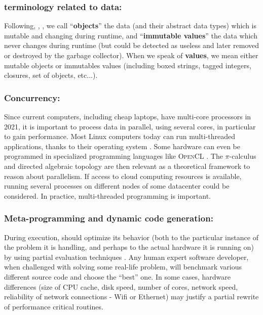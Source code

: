 \documentclass{svproc}
\begin{document}
\subsubsection{terminology related to data:} Following\cite{abadi:2012:theory-objects},
\cite{hindley:2008:lambda}, \cite{queinnec:2003:lisp}, we call
``\textbf{objects}'' the data (and their abstract data types) which is
mutable and changing during runtime, and ``\textbf{immutable values}''
the data which never changes during runtime (but could be detected as
useless and later removed or destroyed by the garbage collector). When
we speak of \textbf{\RefPerSys{} values}, we mean either mutable
objects or immutables values (including boxed strings, tagged
integers, closures, set of objects, etc...).

\subsubsection{Concurrency:}
Since current computers, including cheap laptops, have multi-core
processors in 2021, it is important to process data in parallel, using
several cores, in particular to gain performance. Most Linux computers
today can run multi-threaded applications, thanks to their operating
system \cite{Arpaci-Dusseau:2018:OSBook}. Some hardware can even be
programmed in specialized programming languages like \textsc{OpenCL}
\cite{kaeli:2015:heterogeneous-opencl}. The $\pi$-calculus
\cite{sangiorgi:2003:pi-calculus} and directed algebraic topology
\cite{fajstrup:2016:directed} are then relevant as a theoretical
framework to reason about parallelism. If access to cloud computing
resources is available, running several \RefPerSys{} processes on
different nodes of some datacenter could be considered. In practice,
multi-threaded programming \cite{butenhof:1997:programming} is
important.

\subsubsection{Meta-programming and dynamic code generation:}
During execution, \RefPerSys{} should optimize its behavior (both to
the particular instance of the problem it is handling, and perhaps to
the actual hardware it is running on) by using partial evaluation
techniques \cite{futamura:1999:partial-evaluation}. Any human expert
software developer, when challenged with solving some real-life
problem, will benchmark various different source code and choose the
``best'' one. In some cases, hardware differences (size of CPU cache,
disk speed, number of cores, network speed, reliability of network
connections - Wifi or Ethernet) may justify a partial rewrite of
performance critical routines.
\end{document}
